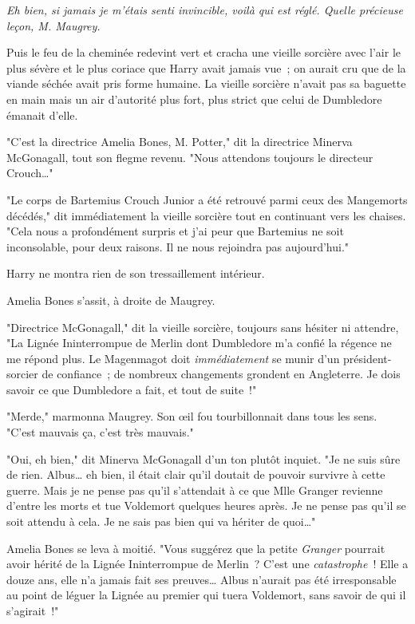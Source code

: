 \emph{Eh bien, si jamais je m'étais senti invincible, voilà qui est réglé. Quelle précieuse leçon, M. Maugrey.}

Puis le feu de la cheminée redevint vert et cracha une vieille sorcière avec l'air le plus sévère et le plus coriace que Harry avait jamais vue~; on aurait cru que de la viande séchée avait pris forme humaine. La vieille sorcière n'avait pas sa baguette en main mais un air d'autorité plus fort, plus strict que celui de Dumbledore émanait d'elle.

"C'est la directrice Amelia Bones, M. Potter," dit la directrice Minerva McGonagall, tout son flegme revenu. "Nous attendons toujours le directeur Crouch…"

"Le corps de Bartemius Crouch Junior a été retrouvé parmi ceux des Mangemorts décédés," dit immédiatement la vieille sorcière tout en continuant vers les chaises. "Cela nous a profondément surpris et j'ai peur que Bartemius ne soit inconsolable, pour deux raisons. Il ne nous rejoindra pas aujourd'hui."

Harry ne montra rien de son tressaillement intérieur.

Amelia Bones s'assit, à droite de Maugrey.

"Directrice McGonagall," dit la vieille sorcière, toujours sans hésiter ni attendre, "La Lignée Ininterrompue de Merlin dont Dumbledore m'a confié la régence ne me répond plus. Le Magenmagot doit \emph{immédiatement} se munir d'un président-sorcier de confiance~; de nombreux changements grondent en Angleterre. Je dois savoir ce que Dumbledore a fait, et tout de suite~!"

"Merde," marmonna Maugrey. Son œil fou tourbillonnait dans tous les sens. "C'est mauvais ça, c'est très mauvais."

"Oui, eh bien," dit Minerva McGonagall d'un ton plutôt inquiet. "Je ne suis sûre de rien. Albus… eh bien, il était clair qu'il doutait de pouvoir survivre à cette guerre. Mais je ne pense pas qu'il s'attendait à ce que Mlle Granger revienne d'entre les morts et tue Voldemort quelques heures après. Je ne pense pas qu'il se soit attendu à cela. Je ne sais pas bien qui va hériter de quoi…"

Amelia Bones se leva à moitié. "Vous suggérez que la petite \emph{Granger} pourrait avoir hérité de la Lignée Ininterrompue de Merlin~? C'est une \emph{catastrophe}~! Elle a douze ans, elle n'a jamais fait ses preuves… Albus n'aurait pas été irresponsable au point de léguer la Lignée au premier qui tuera Voldemort, sans savoir de qui il s'agirait~!"

